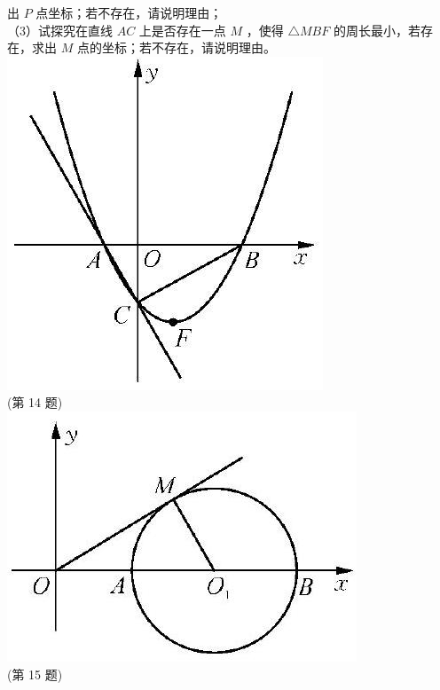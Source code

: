 \documentclass[10pt]{article}
\begin{document}
出 $P$ 点坐标；若不存在，请说明理由；\\
（3）试探究在直线 $A C$ 上是否存在一点 $M$ ，使得 $\triangle M B F$ 的周长最小，若存在，求出 $M$ 点的坐标；若不存在，请说明理由。\\
\includegraphics[max width=\textwidth, center]{2024_10_30_1bf34f7aeb61f11d11d3g-106}\\
(第 14 题)\\
\includegraphics[max width=\textwidth, center]{2024_10_30_1bf34f7aeb61f11d11d3g-106(1)}\\
(第 15 题)
\end{document}
